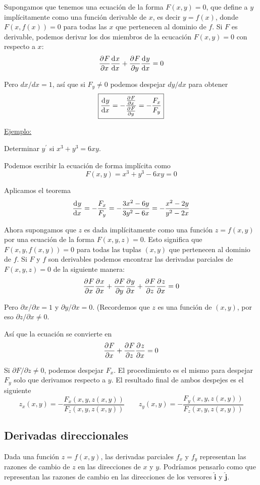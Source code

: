 \documentclass[12pt]{article}
\begin{document}
Supongamos que tenemos una ecuación de la forma $ F(x,y)=0 $, que define a $ y $ implícitamente como una función derivable de $ x $, es decir $ y = f(x) $, donde $ F(x,f(x)) =0 $ para todas las $ x $ que pertenecen al dominio de $ f $. Si $ F $ es derivable, podemos derivar los dos miembros de la ecucación $ F(x,y)=0 $ con respecto a $ x $:
\[
\pdv[]{F}{x}\dv[]{x}{x} + \pdv[]{F}{y}\dv[]{y}{x} = 0
\]

Pero $ dx/dx=1 $, así que si $ F_{y} \neq 0 $ podemos despejar $ dy/dx $ para obtener
\begin{equation}
\boxed{
  \dv[]{y}{x}=-\frac{\pdv[]{F}{x}}{\pdv[]{F}{y}}=-\frac{F_{x}}{F_{y}}
} 
\end{equation}

\underline{Ejemplo:}

Determinar $ y^{\prime} $ si $ x^3 + y^3 = 6xy $.

Podemos escribir la ecuación de forma implícita como 
\[
	F(x,y) = x^3 + y^3 - 6xy =0
\]

Aplicamos el teorema
\[
\dv[]{y}{x} = -\frac{F_{x}}{F_{y}} = -\frac{3x^2-6y}{3y^2-6x}=-\frac{x^2-2y}{y^2-2x}
\]

Ahora supongamos que $ z $ es dada implícitamente como una función $ z=f(x,y) $ por una ecuación de la forma $ F(x,y,z)=0 $. Esto significa que $ F(x,y,f(x,y))=0 $ para todas las tuplas $ (x,y) $ que pertenecen al dominio de $ f $. Si $ F $ y $ f $ son derivables podemos encontrar las derivadas parciales de $ F(x,y,z)=0 $ de la siguiente manera:
\[
\pdv[]{F}{x}\pdv[]{x}{x} + \pdv[]{F}{y}\pdv[]{y}{x} + \pdv[]{F}{z}\pdv[]{z}{x} = 0
\]

Pero $ \partial x/\partial x = 1 $ y $ \partial y/\partial x = 0 $. (Recordemos que $ z $ es una función de $ (x,y) $, por eso $ \partial z/\partial x \neq 0 $.

Así que la ecuación se convierte en 
\[
\pdv[]{F}{x} + \pdv[]{F}{z}\pdv[]{z}{x} = 0
\]

Si $ \partial F/\partial z \neq 0 $, podemos despejar $ F_{x} $. El procedimiento es el mismo para despejar $ F_{y} $ solo que derivamos respecto a $ y $. El resultado final de ambos despejes es el siguiente
\begin{equation}
z_{x}(x,y)=-\frac{F_{x}(x,y,z(x,y))}{F_{z}(x,y,z(x,y))} \qquad z_{y}(x,y)=-\frac{F_{y}(x,y,z(x,y))}{F_{z}(x,y,z(x,y))} 
\end{equation}

\subsection{Derivadas direccionales}
Dada una función $ z=f(x,y) $, las derivadas parciales $ f_{x} $ y $ f_{y} $ representan las razones de cambio de $ z $ en las direcciones de $ x $ y $ y $. Podríamos pensarlo como que representan las razones de cambio en las direcciones de los versores $ \hat{\mathbf{i}} $ y $ \hat{\mathbf{j}} $.
\end{document}
